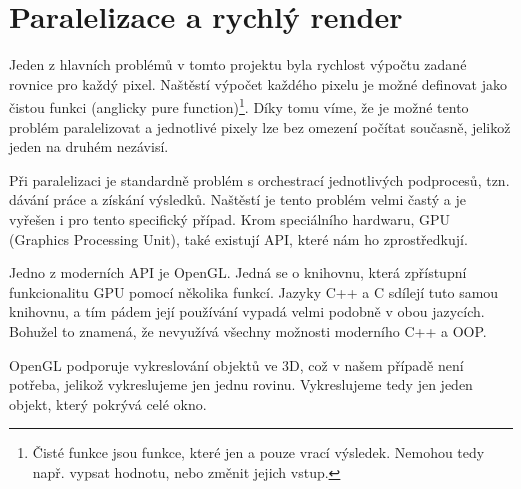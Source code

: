 \section{Paralelizace a rychlý render}
Jeden z hlavních problémů v tomto projektu byla rychlost výpočtu zadané rovnice
pro každý pixel. Naštěstí výpočet každého pixelu je možné definovat jako čistou
funkci (anglicky pure fun\-ction)\footnote{Čisté funkce jsou funkce, které jen a
pouze vrací výsledek. Nemohou tedy např. vypsat hodnotu, nebo změnit jejich
vstup.}. Díky tomu víme, že je možné tento problém paralelizovat a jednotlivé
pixely lze bez omezení počítat současně, jelikož jeden na druhém nezávisí.

Při paralelizaci je standardně problém s orchestrací jednotlivých podprocesů,
tzn. dávání práce a získání výsledků. Naštěstí je tento problém velmi častý a
je vyřešen i pro tento specifický případ. Krom speciálního hardwaru, GPU
(Graphics Processing Unit), také existují API, které nám ho zprostředkují.

Jedno z moderních API je OpenGL. Jedná se o knihovnu, která zpřístupní
funkcionalitu GPU pomocí několika funkcí. Jazyky C++ a C sdílejí tuto samou
knihovnu, a tím pádem její používání vypadá velmi podobně v obou jazycích.
Bohužel to znamená, že nevyužívá všechny možnosti moderního C++ a OOP.

OpenGL podporuje vykreslování objektů ve 3D, což v našem případě není potřeba,
jelikož vykreslujeme jen jednu rovinu. Vykreslujeme tedy jen jeden objekt,
který pokrývá celé okno.

